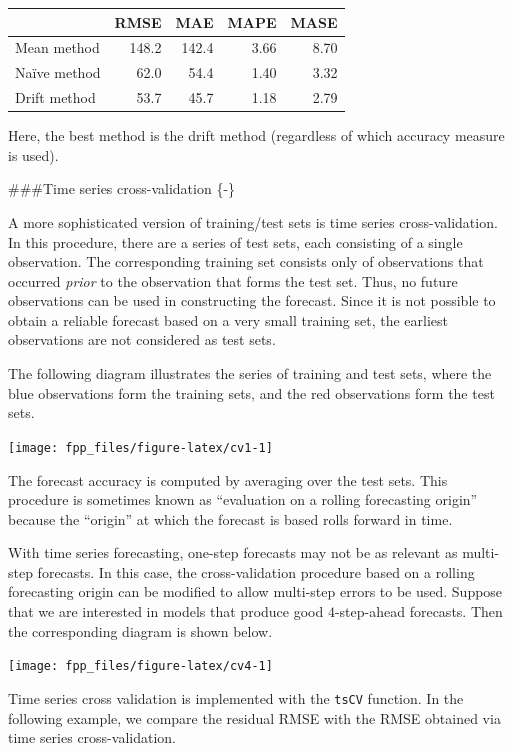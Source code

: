 \documentclass[]{book}
\begin{document}
\begin{tabular}{lrrrr}
\toprule
  & RMSE & MAE & MAPE & MASE\\
\midrule
Mean method & 148.2 & 142.4 & 3.66 & 8.70\\
Naïve method & 62.0 & 54.4 & 1.40 & 3.32\\
Drift method & 53.7 & 45.7 & 1.18 & 2.79\\
\bottomrule
\end{tabular}

Here, the best method is the drift method (regardless of which accuracy measure is used).

\#\#\#Time series cross-validation \{-\}

A more sophisticated version of training/test sets is time series cross-validation. In this procedure, there are a series of test sets, each consisting of a single observation. The corresponding training set consists only of observations that occurred \emph{prior} to the observation that forms the test set. Thus, no future observations can be used in constructing the forecast. Since it is not possible to obtain a reliable forecast based on a very small training set, the earliest observations are not considered as test sets.

The following diagram illustrates the series of training and test sets, where the blue observations form the training sets, and the red observations form the test sets.

\begin{center}\texttt{[image: fpp\_files/figure-latex/cv1-1]} \end{center}

The forecast accuracy is computed by averaging over the test sets. This procedure is sometimes known as ``evaluation on a rolling forecasting origin'' because the ``origin'' at which the forecast is based rolls forward in time.

With time series forecasting, one-step forecasts may not be as relevant as multi-step forecasts. In this case, the cross-validation procedure based on a rolling forecasting origin can be modified to allow multi-step errors to be used. Suppose that we are interested in models that produce good \(4\)-step-ahead forecasts. Then the corresponding diagram is shown below.

\begin{center}\texttt{[image: fpp\_files/figure-latex/cv4-1]} \end{center}

Time series cross validation is implemented with the \texttt{tsCV} function. In the following example, we compare the residual RMSE with the RMSE obtained via time series cross-validation.
\end{document}
